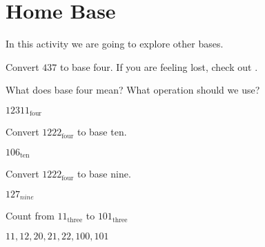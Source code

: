 \documentclass{ximera}
\begin{document}
\section{Home Base}
In this activity we are going to explore other bases. 


\begin{question}
  Convert $437$ to base four. If you are feeling lost, check out
  .
  \begin{answer}
    \begin{hint}
      What does base four mean?
      \pause
      What operation should we use?
    \end{hint}
  $12311_{\text{four}}$ %
  \end{answer}
\end{question}


\begin{question}
  Convert $1222_{\text{four}}$ to base ten.
  \begin{answer}
  $106_{\text{ten}}$ %
  \end{answer}
\end{question}


\begin{question}
  Convert $1222_{\text{four}}$ to base nine.
  \begin{answer}
  $127_{nine}$ %
  \end{answer}
\end{question}

\begin{question}
  Count from $11_\text{three}$ to $101_\text{three}$
  \begin{answer}
    $11, 12, 20, 21, 22, 100, 101$ %
  \end{answer}
\end{question}
\end{document}
